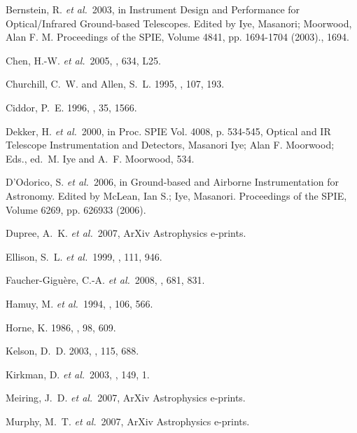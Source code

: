\documentclass[12pt,preprint]{aastex}
\begin{document}
\begin{thebibliography}{}

{Bernstein}, R. {\it et al.}\  2003, in { Instrument Design and Performance for
  Optical/Infrared Ground-based Telescopes. Edited by Iye, Masanori; Moorwood,
  Alan F. M. Proceedings of the SPIE, Volume 4841, pp. 1694-1704 (2003).},
  1694.

{Chen}, H.-W. {\it et al.}\  2005, \apjl, 634, L25.

{Churchill}, C.~W. and {Allen}, S.~L. 1995, \pasp, 107, 193.

{Ciddor}, P.~E. 1996, \ao, 35, 1566.

{Dekker}, H. {\it et al.}\  2000, in { Proc. SPIE Vol. 4008, p. 534-545,
  Optical and IR Telescope Instrumentation and Detectors, Masanori Iye; Alan F.
  Moorwood; Eds.}, ed.\ M. {Iye} and A.~F. {Moorwood}, 534.

{D'Odorico}, S. {\it et al.}\  2006, in { Ground-based and Airborne
  Instrumentation for Astronomy. Edited by McLean, Ian S.; Iye, Masanori.
  Proceedings of the SPIE, Volume 6269, pp. 626933 (2006).}

{Dupree}, A.~K. {\it et al.}\  2007, ArXiv Astrophysics e-prints.

{Ellison}, S.~L. {\it et al.}\  1999, \pasp, 111, 946.

{Faucher-Gigu{\`e}re}, C.-A. {\it et al.}\  2008, \apj, 681, 831.

{Hamuy}, M. {\it et al.}\  1994, \pasp, 106, 566.

{Horne}, K. 1986, \pasp, 98, 609.

{Kelson}, D.~D. 2003, \pasp, 115, 688.

{Kirkman}, D. {\it et al.}\  2003, \apjs, 149, 1.

{Meiring}, J.~D. {\it et al.}\  2007, ArXiv Astrophysics e-prints.

{Murphy}, M.~T. {\it et al.}\  2007, ArXiv Astrophysics e-prints.


\end{thebibliography}
\end{document}
